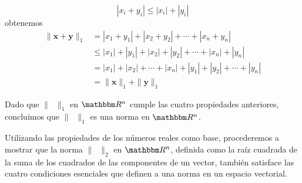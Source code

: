 \begin{examplebox}{}{}
\begin{enumerate}[label=\roman*), topsep=6pt, itemsep=0pt]
        $$|x_i + y_i| \leq |x_i| + |y_i|$$
        obtenemos
        \begin{align*}
            \| \mathbf{x} + \mathbf{y} \|_1 & = |x_1 + y_1| + |x_2 + y_2| + \cdots + |x_n + y_n| \\
            & \leq |x_1| + |y_1| + |x_2| + |y_2| + \cdots + |x_n| + |y_n| \\
            & = |x_1| + |x_2| + \cdots + |x_n| + |y_1| + |y_2| + \cdots + |y_n| \\
            & = \| \mathbf{x} \|_1 + \| \mathbf{y} \|_1
        \end{align*}
    \end{enumerate}
    Dado que $\| \phantom{x} \|_1$ en $\RR[n]$ cumple las cuatro propiedades anteriores, concluimos que $\| \phantom{x} \|_1$ es una norma en $\RR[n]$.
\end{examplebox}

Utilizando las propiedades de los números reales como base, procederemos a mostrar que la norma $\| \phantom{x} \|_2$ en $\RR[n]$, definida como la raíz cuadrada de la suma de los cuadrados de las componentes de un vector, también satisface las cuatro condiciones esenciales que definen a una norma en un espacio vectorial.

